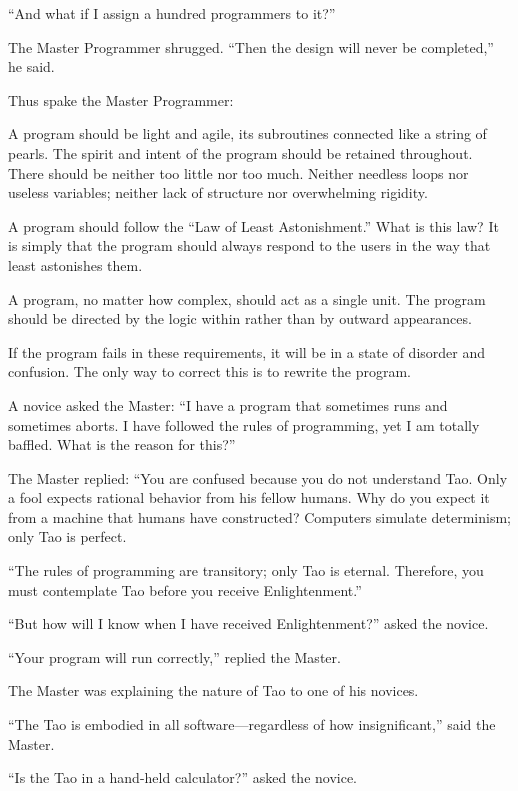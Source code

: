 ``And what if I assign a hundred programmers to it?''

The Master Programmer shrugged. ``Then the design will never be
completed,'' he said.

Thus spake the Master Programmer:

A program should be light and agile, its subroutines connected like a
string of pearls. The spirit and intent of the program should be
retained throughout. There should be neither too little nor too
much. Neither needless loops nor useless variables; neither lack of
structure nor overwhelming rigidity.

A program should follow the ``Law of Least Astonishment.'' What is
this law? It is simply that the program should always respond to the
users in the way that least astonishes them.

A program, no matter how complex, should act as a single unit. The
program should be directed by the logic within rather than by outward
appearances.

If the program fails in these requirements, it will be in a state of
disorder and confusion. The only way to correct this is to rewrite the
program.

A novice asked the Master: ``I have a program that sometimes runs and
sometimes aborts. I have followed the rules of programming, yet I am
totally baffled. What is the reason for this?''

The Master replied: ``You are confused because you do not understand
Tao. Only a fool expects rational behavior from his fellow humans. Why
do you expect it from a machine that humans have constructed?
Computers simulate determinism; only Tao is perfect.

``The rules of programming are transitory; only Tao is
eternal. Therefore, you must contemplate Tao before you receive
Enlightenment.''

``But how will I know when I have received Enlightenment?'' asked the
novice.

``Your program will run correctly,'' replied the Master.

The Master was explaining the nature of Tao to one of his novices.

``The Tao is embodied in all software---regardless of how
insignificant,'' said the Master.

``Is the Tao in a hand-held calculator?'' asked the novice.

